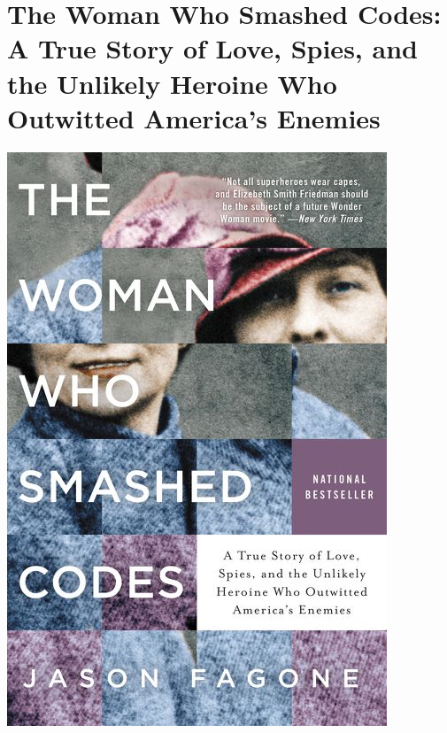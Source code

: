 \documentclass{tufte-handout}
\makeatletter
\newcommand{\varcaption}[2][0pt]{%
  \gsetlength{\@tufte@caption@vertical@offset}{-#1}%
  \gdef\@tufte@stored@varcaption{#2}%
}
\gdef\@tufte@stored@varcaption{} %
\makeatother
\begin{document}
\section*{The Woman Who Smashed Codes: A True Story of Love, Spies, and the Unlikely Heroine Who Outwitted America's Enemies}
\begin{marginfigure}[14\baselineskip]
   \includegraphics[width=\linewidth]{images/woman_who_smashes_codes.jpg}
   \varcaption{\href{https://www.harpercollins.com/9780062430489/the-woman-who-smashed-codes/}{Publisher Link}, \href{https://www.amazon.com/Woman-Who-Smashed-Codes-Outwitted/dp/0062430513/}{Amazon Link}}
\end{marginfigure}
\end{document}
